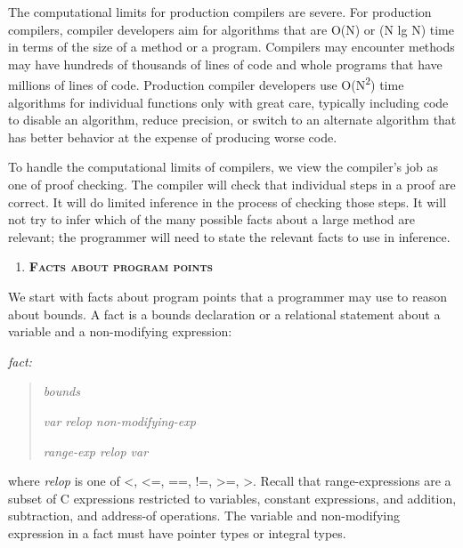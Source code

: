 \documentclass[]{article}
\begin{document}
The computational limits for production compilers are severe. For
production compilers, compiler developers aim for algorithms that are
O(N) or (N lg N) time in terms of the size of a method or a program.
Compilers may encounter methods may have hundreds of thousands of lines
of code and whole programs that have millions of lines of code.
Production compiler developers use O(N\textsuperscript{2}) time
algorithms for individual functions only with great care, typically
including code to disable an algorithm, reduce precision, or switch to
an alternate algorithm that has better behavior at the expense of
producing worse code.

To handle the computational limits of compilers, we view the compiler's
job as one of proof checking. The compiler will check that individual
steps in a proof are correct. It will do limited inference in the
process of checking those steps. It will not try to infer which of the
many possible facts about a large method are relevant; the programmer
will need to state the relevant facts to use in inference.

\begin{enumerate}
\def\labelenumi{\arabic{enumi}.}
\item
  \protect\hypertarget{ux5fToc420589187}{}{\protect\hypertarget{ux5fToc422906978}{}{\protect\hypertarget{ux5fToc424307718}{}{\protect\hypertarget{ux5fToc426641116}{}{\protect\hypertarget{ux5fToc435434991}{}{\protect\hypertarget{ux5fToc437460824}{}{\protect\hypertarget{ux5fToc440445505}{}{\protect\hypertarget{ux5fToc440449287}{}{\protect\hypertarget{ux5fToc440551937}{}{}}}}}}}}}\textbf{\textsc{Facts
  about program points}}
\end{enumerate}

We start with facts about program points that a programmer may use to
reason about bounds. A fact is a bounds declaration or a relational
statement about a variable and a non-modifying expression:

\emph{fact: }

\begin{quote}
\emph{bounds}

\emph{var relop non-modifying-exp}

\emph{range-exp relop var}
\end{quote}

where \emph{relop} is one of \textless{}, \textless{}=, ==, !=,
\textgreater{}=, \textgreater{}. Recall that range-expressions are a
subset of C expressions restricted to variables, constant expressions,
and addition, subtraction, and address-of operations. The variable and
non-modifying expression in a fact must have pointer types or integral
types.
\end{document}
